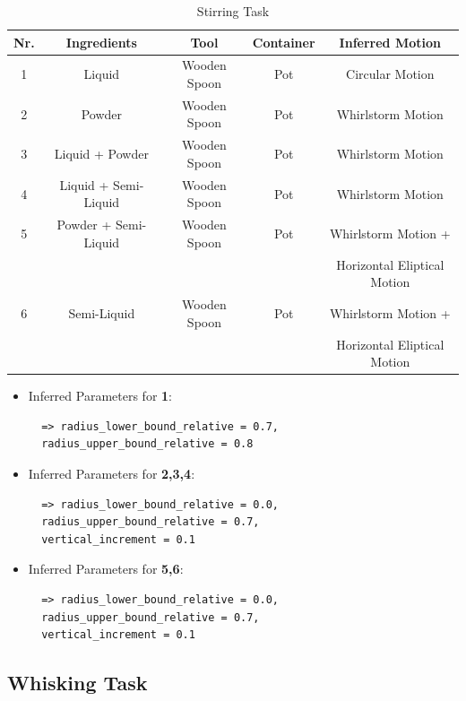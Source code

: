 \begin{table}[H]
  \centering
  \begin{tabular}{|c|c|c|c|c|}
    \hline
    \textbf{Nr.} & \textbf{Ingredients} & \textbf{Tool} & \textbf{Container} & \textbf{Inferred Motion}  \\
    \hline
    1 & Liquid & Wooden Spoon & Pot & Circular Motion \\
    \hline
    2 & Powder & Wooden Spoon & Pot & Whirlstorm Motion\\
    \hline
    3 & Liquid + Powder & Wooden Spoon & Pot & Whirlstorm Motion \\
    \hline
    4 & Liquid + Semi-Liquid & Wooden Spoon & Pot & Whirlstorm Motion \\
    \hline
    5 & Powder + Semi-Liquid & Wooden Spoon & Pot & Whirlstorm Motion +
    \\ & & &  &Horizontal Eliptical Motion \\
    \hline
    6 & Semi-Liquid & Wooden Spoon & Pot & Whirlstorm Motion +
    \\ & & &  &Horizontal Eliptical Motion \\
    \hline
  \end{tabular}
  \caption{Stirring Task}
  \label{tab:mixingtask}
\end{table}

\begin{itemize}
\item Inferred Parameters for \textbf{1}: 
 \begin{lstlisting}
  => radius_lower_bound_relative = 0.7, 
  radius_upper_bound_relative = 0.8
\end{lstlisting}
\item Inferred Parameters for \textbf{2,3,4}:
\begin{lstlisting}
  => radius_lower_bound_relative = 0.0, 
  radius_upper_bound_relative = 0.7,
  vertical_increment = 0.1
\end{lstlisting}
\item Inferred Parameters for \textbf{5,6}:
\begin{lstlisting}
  => radius_lower_bound_relative = 0.0, 
  radius_upper_bound_relative = 0.7,
  vertical_increment = 0.1
\end{lstlisting}
\end{itemize}

\subsection{Whisking Task}


